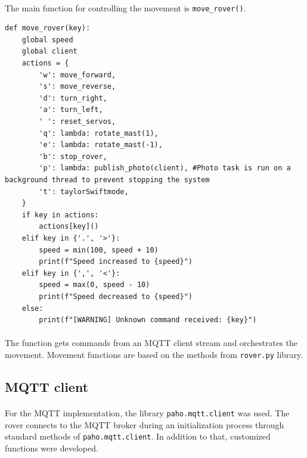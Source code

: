 \paragraph{} The main function for controlling the movement is \lstinline|move_rover()|.
\begin{lstlisting}[style=courier12]
def move_rover(key):
    global speed
    global client
    actions = {
        'w': move_forward,
        's': move_reverse,
        'd': turn_right,
        'a': turn_left,
        ' ': reset_servos,
        'q': lambda: rotate_mast(1),
        'e': lambda: rotate_mast(-1),
        'b': stop_rover,
        'p': lambda: publish_photo(client), #Photo task is run on a background thread to prevent stopping the system
        't': taylorSwiftmode,
    }
    if key in actions:
        actions[key]()
    elif key in {'.', '>'}:
        speed = min(100, speed + 10)
        print(f"Speed increased to {speed}")
    elif key in {',', '<'}:
        speed = max(0, speed - 10)
        print(f"Speed decreased to {speed}")
    else:
        print(f"[WARNING] Unknown command received: {key}")
\end{lstlisting}
\paragraph{}The function gets commands from an MQTT client stream and orchestrates the movement. Movement functions are based on the methods from \lstinline|rover.py| library.   

\subsection{MQTT client}
\paragraph{} For the MQTT implementation, the library \lstinline|paho.mqtt.client| was used. The rover connects to the MQTT broker during an initialization process through standard methods of \lstinline|paho.mqtt.client|. In addition to that, customized functions were developed.
